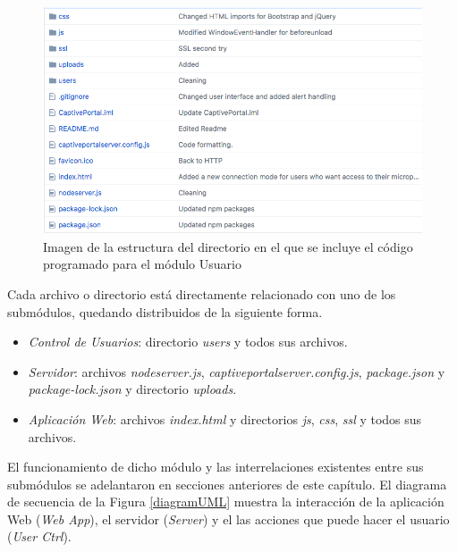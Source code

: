 \begin{figure}[!t]
\begin{center}
\includegraphics[width=0.75\linewidth]{./5_AnalisisOrganico/Img/repoGitHub.png}
\end{center}
\caption{Imagen de la estructura del directorio en el que se incluye el código programado para el módulo Usuario}
\label{repoGitHub}
\end{figure}

Cada archivo o directorio está directamente relacionado con uno de los submódulos, quedando distribuidos de la siguiente forma.

\begin{itemize}
\item \emph{Control de Usuarios}: directorio \emph{users} y todos sus archivos.
\item \emph{Servidor}: archivos \emph{nodeserver.js}, \emph{captiveportalserver.config.js}, \emph{package.json} y \emph{package-lock.json} y directorio \emph{uploads}.
\item \emph{Aplicación Web}: archivos \emph{index.html} y directorios \emph{js}, \emph{css}, \emph{ssl} y todos sus archivos.
\end{itemize}

El funcionamiento de dicho módulo y las interrelaciones existentes entre sus submódulos se adelantaron en secciones anteriores de este capítulo. El diagrama de secuencia de la Figura \ref{diagramUML} muestra la interacción de la aplicación Web (\emph{Web App}), el servidor (\emph{Server}) y el las acciones que puede hacer el usuario (\emph{User Ctrl}).

